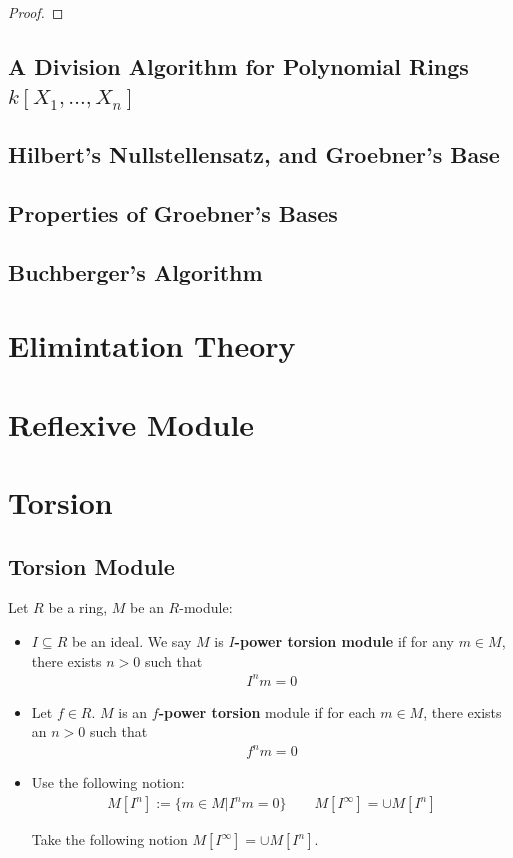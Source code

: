 \documentclass[Total.tex]{subfiles}
\begin{document}
				\begin{proof}
				\end{proof}
				
			\section{A Division Algorithm for Polynomial Rings $k[X_1,\dots,X_n]$}
			
			\section{Hilbert's Nullstellensatz, and Groebner's Base}
			
			\section{Properties of Groebner's Bases}
			
			\section{Buchberger's Algorithm}
			
		\chapter{Elimintation Theory}
		\chapter{Reflexive Module}
		\chapter{Torsion}
			\section{Torsion Module}
				\begin{Def}
					Let $R$ be a ring, $M$ be an $R$-module:
					\begin{itemize}
						\item $I\subseteq R$ be an ideal. We say $M$ is \textbf{$I$-power torsion module} if for any $m\in M$, there exists $n>0$ such that
						\begin{gather*}
							I^nm=0
						\end{gather*} 
						\item Let $f\in R$. $M$ is an \textbf{$f$-power torsion} module if for each $m\in M$, there exists an $n>0$ such that
						\begin{gather*}
							f^n m=0
						\end{gather*}
						
						\item  Use the following notion:
						\begin{gather*}
							M[I^n]:=\{m\in M|I^n m=0\}\qquad M[I^\infty]=\cup M[I^n]
						\end{gather*}
						
						Take the following notion $M[I^\infty]=\cup M[I^n]$. 
					\end{itemize}
				\end{Def}
				
\end{document}
